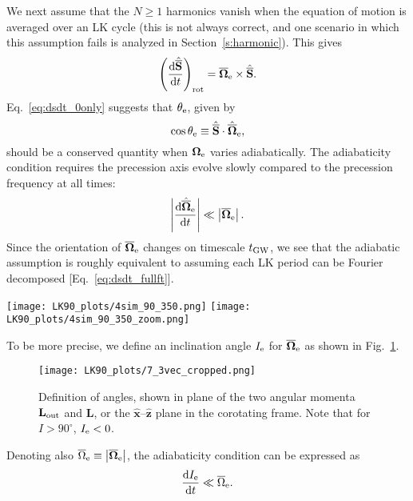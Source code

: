 \documentclass[
        twocolumn,
        twocolappendix
    ]{aastex63}
\newcommand*{\rd}[2]{\frac{\mathrm{d}#1}{\mathrm{d}#2}}
\newcommand*{\abs}[1]{\left|#1\right|}
\renewcommand*{\bm}[1]{\boldsymbol{\mathbf{#1}}}
\newcommand*{\uv}[1]{\hat{\bm{#1}}}
\newcommand*{\p}[1]{\left(#1\right)}
\begin{document}
We next assume that the $N \geq 1$ harmonics vanish when the equation of motion
is averaged over an LK cycle (this is not always correct, and one scenario in
which this assumption fails is analyzed in Section~\ref{s:harmonic}). This gives
\begin{equation}
    \p{\rd{\uv{\overline{S}}}{t}}_{\rm rot}
        = \bm{\overline{\Omega}}_{\rm e}
            \times \uv{\overline{S}}.\label{eq:dsdt_0only}
\end{equation}
Eq.~\eqref{eq:dsdt_0only} suggests that $\theta_{\rm e}$, given by
\begin{equation}
    \cos \theta_{\rm e} \equiv
        \uv{\overline{S}} \cdot \uv{\overline{\Omega}}_{\rm e},
        \label{eq:q_eff}
\end{equation}
should be a conserved quantity when $\bm{\Omega}_{\rm e}$ varies adiabatically.
The adiabaticity condition requires the precession axis evolve slowly compared
to the precession frequency at all times:
\begin{equation}
    \abs{\rd{\uv{\overline{\Omega}}_{\rm e}}{t}} \ll
        \abs{\bm{\overline{\Omega}}_{\rm e}}. \label{eq:ad_constr}
\end{equation}
Since the orientation of $\bm{\overline{\Omega}}_{\rm e}$ changes on timescale
$t_{\rm GW}$, we see that the adiabatic assumption is roughly equivalent to
assuming each LK period can be Fourier decomposed [Eq.~\eqref{eq:dsdt_fullft}].

\begin{figure*}
    \centering
    \texttt{[image: LK90\_plots/4sim\_90\_350.png]}
    \texttt{[image: LK90\_plots/4sim\_90\_350\_zoom.png]}
    \caption{Plot.}\label{fig:4sim_90_350}
\end{figure*}

To be more precise, we define an inclination angle $I_{\rm e}$ for
$\bm{\overline{\Omega}}_{\rm e}$ as shown in Fig.~\ref{fig:3vec}.
\begin{figure}
    \centering
    \texttt{[image: LK90\_plots/7\_3vec\_cropped.png]}
    \caption{Definition of angles, shown in plane of the two angular momenta
    $\bm{L}_{\rm out}$ and $\bm{L}$, or the $\uv{x}$--$\uv{z}$ plane in the
    corotating frame. Note that for $I > 90^\circ$, $I_{\rm e} <
    0$.}\label{fig:3vec}
\end{figure}
Denoting also $\overline{\Omega}_{\rm e} \equiv \abs{\bm{\overline{\Omega}}_{\rm
e}}$, the adiabaticity condition can be expressed as
\begin{equation}
    \rd{I_{\rm e}}{t} \ll \overline{\Omega}_{\rm e}.\label{eq:ad_constr_idot}
\end{equation}
\end{document}
